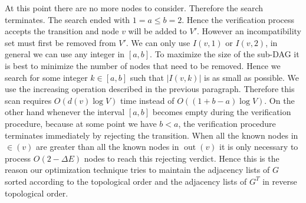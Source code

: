 \documentclass[a4paper]{article}
\DeclareMathOperator{\out}{out}
\begin{document}
At this point there are no more nodes to consider. Therefore the search
terminates. The search ended with $1 = a \leq b = 2$. Hence the
verification process accepts the transition and node $v$ will be added to
$V'$. However an incompatibility set must first be removed from $V'$. We
can only use $I(v, 1)$ or $I(v, 2)$, in general we can use any integer in
$[a,b]$. To maximize the size of the sub-DAG it is best to minimize the
number of nodes that need to be removed. Hence we search for some integer
$k \in [a,b]$ such that $|I(v,k)|$ is as small as possible. We use the
increasing operation described in the previous paragraph. Therefore this
scan requires $O(d(v) \log V)$ time instead of $O((1+b-a) \log V)$. On the
other hand whenever the interval $[a,b]$ becomes empty during the
verification procedure, because at some point we have $b < a$, the
verification procedure terminates immediately by rejecting the
transition. When all the known nodes in $\in(v)$ are greater than all the
known nodes in $\out(v)$ it is only necessary to process $O(2 -\Delta E)$
nodes to reach this rejecting verdict. Hence this is the reason our
optimization technique tries to maintain the adjacency lists of $G$ sorted
according to the topological order and the adjacency lists of $G^T$ in
reverse topological order.
\end{document}

